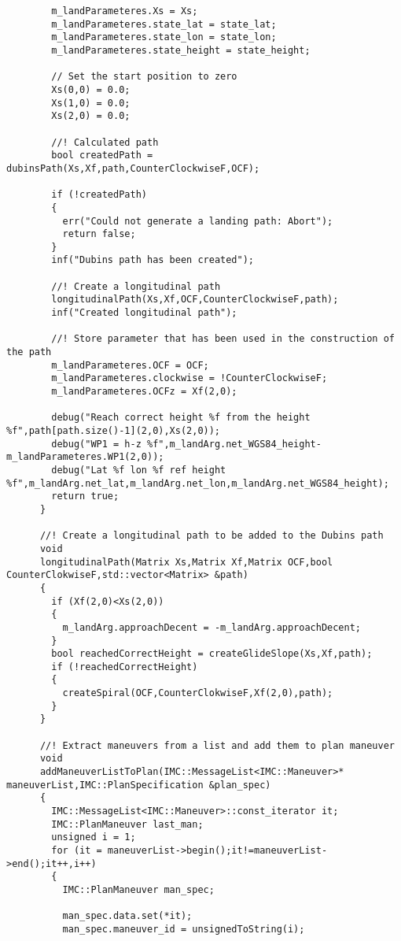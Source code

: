 \begin{frame}[fragile]
\begin{lstlisting}
        m_landParameteres.Xs = Xs;
        m_landParameteres.state_lat = state_lat;
        m_landParameteres.state_lon = state_lon;
        m_landParameteres.state_height = state_height;

        // Set the start position to zero
        Xs(0,0) = 0.0;
        Xs(1,0) = 0.0;
        Xs(2,0) = 0.0;

        //! Calculated path
        bool createdPath = dubinsPath(Xs,Xf,path,CounterClockwiseF,OCF);

        if (!createdPath)
        {
          err("Could not generate a landing path: Abort");
          return false;
        }
        inf("Dubins path has been created");

        //! Create a longitudinal path
        longitudinalPath(Xs,Xf,OCF,CounterClockwiseF,path);
        inf("Created longitudinal path");

        //! Store parameter that has been used in the construction of the path
        m_landParameteres.OCF = OCF;
        m_landParameteres.clockwise = !CounterClockwiseF;
        m_landParameteres.OCFz = Xf(2,0);

        debug("Reach correct height %f from the height %f",path[path.size()-1](2,0),Xs(2,0));
        debug("WP1 = h-z %f",m_landArg.net_WGS84_height-m_landParameteres.WP1(2,0));
        debug("Lat %f lon %f ref height %f",m_landArg.net_lat,m_landArg.net_lon,m_landArg.net_WGS84_height);
        return true;
      }

      //! Create a longitudinal path to be added to the Dubins path
      void
      longitudinalPath(Matrix Xs,Matrix Xf,Matrix OCF,bool CounterClokwiseF,std::vector<Matrix> &path)
      {
        if (Xf(2,0)<Xs(2,0))
        {
          m_landArg.approachDecent = -m_landArg.approachDecent;
        }
        bool reachedCorrectHeight = createGlideSlope(Xs,Xf,path);
        if (!reachedCorrectHeight)
        {
          createSpiral(OCF,CounterClokwiseF,Xf(2,0),path);
        }
      }

      //! Extract maneuvers from a list and add them to plan maneuver
      void
      addManeuverListToPlan(IMC::MessageList<IMC::Maneuver>* maneuverList,IMC::PlanSpecification &plan_spec)
      {
        IMC::MessageList<IMC::Maneuver>::const_iterator it;
        IMC::PlanManeuver last_man;
        unsigned i = 1;
        for (it = maneuverList->begin();it!=maneuverList->end();it++,i++)
        {
          IMC::PlanManeuver man_spec;

          man_spec.data.set(*it);
          man_spec.maneuver_id = unsignedToString(i);


\end{lstlisting}
\end{frame}

